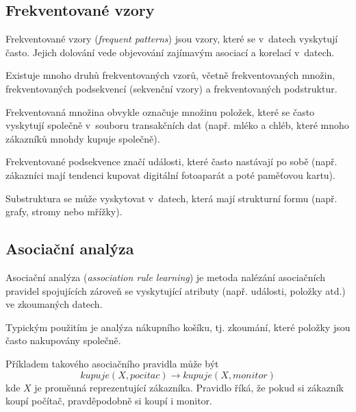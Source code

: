 \subsection{Frekventované vzory}

\begin{compactitem}
    \item Frekventované vzory (\textit{frequent patterns}) jsou vzory, které se v~datech vyskytují často. Jejich dolování vede objevování zajímavým asociací a korelací v~datech.

    \item Existuje mnoho druhů frekventovaných vzorů, včetně frekventovaných množin, frekventovaných podsekvencí (sekvenční vzory) a frekventovaných podstruktur.

    \item Frekventovaná množina obvykle označuje množinu položek, které se často vyskytují společně v~souboru transakčních dat (např. mléko a chléb, které mnoho zákazníků mnohdy kupuje společně).

    \item Frekventované podsekvence značí události, které často nastávají po sobě (např. zákazníci mají tendenci kupovat digitální fotoaparát a poté paměťovou kartu).

    \item Substruktura se může vyskytovat v~datech, která mají strukturní formu (např. grafy, stromy nebo mřížky).
\end{compactitem}

\subsection{Asociační analýza}

\begin{compactitem}
    \item Asociační analýza (\textit{association rule learning}) je metoda nalézání asociačních pravidel spojujících zároveň se vyskytující atributy (např. události, položky atd.) ve zkoumaných datech.

    \item Typickým použitím je analýza nákupního košíku, tj. zkoumání, které položky jsou často nakupovány společně.

    \item Příkladem takového asociačního pravidla může být
    \begin{equation}
        kupuje(X, pocitac) \rightarrow kupuje(X, monitor)
    \end{equation}
    kde $X$ je proměnná reprezentující zákazníka. Pravidlo říká, že pokud si zákazník koupí počítač, pravděpodobně si koupí i monitor.
\end{compactitem}

